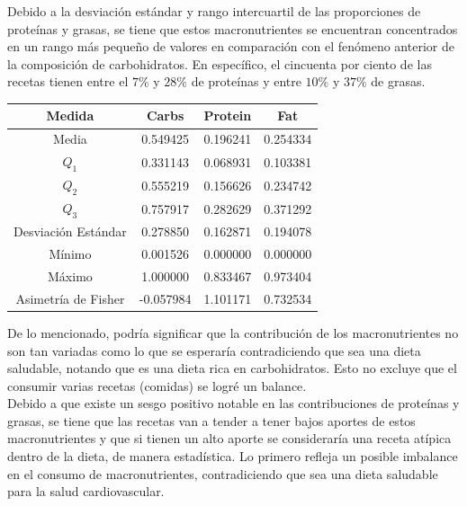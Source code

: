 \documentclass[12pt,a4paper]{article}
\begin{document}
            Debido a la desviación estándar y rango intercuartil de las proporciones 
            de proteínas y grasas, se tiene que estos macronutrientes se encuentran 
            concentrados en un rango más pequeño de valores en comparación con el 
            fenómeno anterior de la composición de carbohidratos. En específico, el 
            cincuenta por ciento de las recetas tienen entre el $7\%$ y $28\%$ de 
            proteínas y entre $10\%$ y $37\%$ de grasas.

            \begin{center}
                \begin{tabular}{| c | c c c |}
                    \toprule
                    Medida & Carbs & Protein & Fat \\
                    \midrule
                    Media               & 0.549425 & 0.196241 & 0.254334  \\
                    $Q_1$               & 0.331143 & 0.068931 & 0.103381  \\
                    $Q_2$               & 0.555219 & 0.156626 & 0.234742  \\
                    $Q_3$               & 0.757917 & 0.282629 &	0.371292  \\
                    Desviación Estándar & 0.278850 & 0.162871 & 0.194078  \\
                    Mínimo              & 0.001526 & 0.000000 & 0.000000  \\
                    Máximo              & 1.000000 & 0.833467 & 0.973404  \\
                    Asimetría de Fisher & -0.057984 & 1.101171 & 0.732534  \\
                    \bottomrule
                \end{tabular}
            \end{center}

            De lo mencionado, podría significar que la contribución de los macronutrientes 
            no son tan variadas como lo que se esperaría contradiciendo que sea una 
            dieta saludable, notando que es una dieta rica en carbohidratos. Esto no 
            excluye que el consumir varias recetas (comidas) se logré un balance.\\

            Debido a que existe un sesgo positivo notable en las contribuciones de 
            proteínas y grasas, se tiene que las recetas van a tender a tener bajos 
            aportes de estos macronutrientes y que si tienen un alto aporte se 
            consideraría una receta atípica dentro de la dieta, de manera estadística. 
            Lo primero refleja un posible imbalance en el consumo de macronutrientes, 
            contradiciendo que sea una dieta saludable para la salud cardiovascular.
\end{document}

